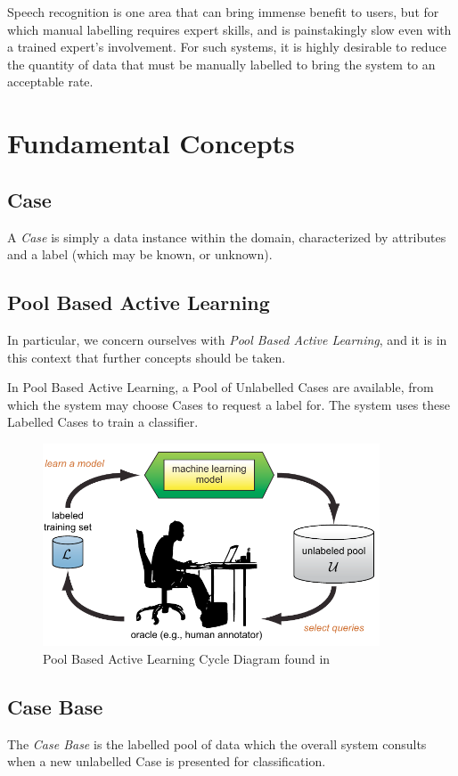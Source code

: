 \documentclass[a4paper,11pt]{report}
\begin{document}
Speech recognition is one area that can bring immense benefit to users, but for which manual labelling requires expert skills, and is painstakingly slow even with a trained expert's involvement. For such systems, it is highly desirable to reduce the quantity of data that must be manually labelled to bring the system to an acceptable rate.

\section{Fundamental Concepts}
\subsection{Case}
A \emph{Case} is simply a data instance within the domain, characterized by attributes and a label (which may be known, or unknown).

\subsection{Pool Based Active Learning}
In particular, we concern ourselves with \emph{Pool Based Active Learning}, and it is in this context that further concepts should be taken.

In Pool Based Active Learning, a Pool of Unlabelled Cases are available, from which the system may choose Cases to request a label for. The system uses these Labelled Cases to train a classifier.

\begin{figure}[h!] \centering
\includegraphics[width=10cm]{./Others/Settles2010PoolBasedImage}
\caption*{Pool Based Active Learning Cycle Diagram found in \citet{Settles2010}}
\end{figure}

\subsection{Case Base}
The \emph{Case Base} is the labelled pool of data which the overall system consults when a new unlabelled Case is presented for classification.
\end{document}
